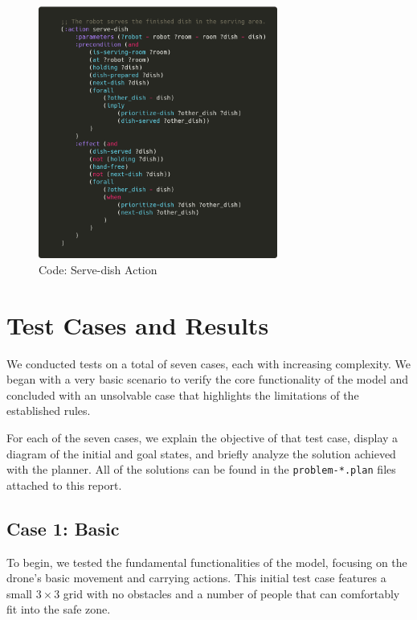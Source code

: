 \documentclass{article}
\begin{document}
    \begin{figure}[ht]
    \centering
    \includegraphics[width=0.70\textwidth]{assets/serve-dish.png}
    \caption{Code: Serve-dish Action}
    \label{fig:act:serve-dish}
\end{figure}

\newpage
\section{Test Cases and Results}

We conducted tests on a total of seven cases, each with increasing complexity. We began with a very basic scenario to verify the core functionality of the model and concluded with an unsolvable case that highlights the limitations of the established rules.

For each of the seven cases, we explain the objective of that test case, display a diagram of the initial and goal states, and briefly analyze the solution achieved with the planner. All of the solutions can be found in the \texttt{problem-*.plan} files attached to this report.

\subsection{Case 1: Basic}

To begin, we tested the fundamental functionalities of the model, focusing on the drone's basic movement and carrying actions. This initial test case features a small \(3 \times 3\) grid with no obstacles and a number of people that can comfortably fit into the safe zone.
\end{document}
